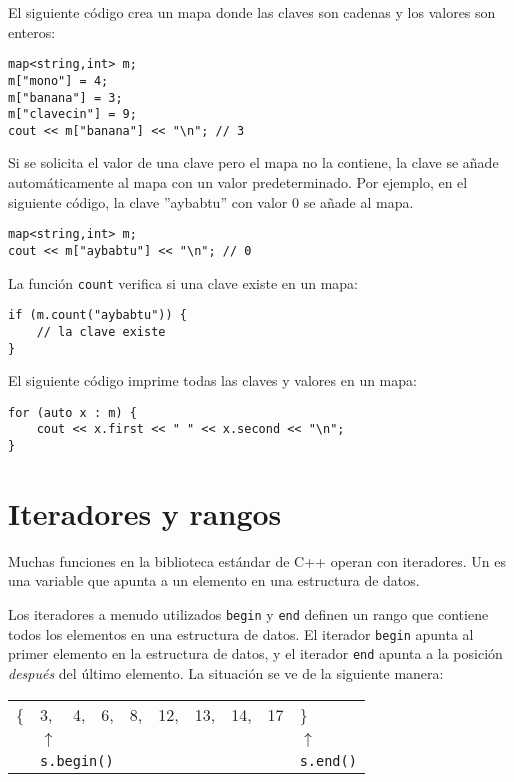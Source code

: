 El siguiente código crea un mapa
donde las claves son cadenas y los valores son enteros:

\begin{lstlisting}
map<string,int> m;
m["mono"] = 4;
m["banana"] = 3;
m["clavecin"] = 9;
cout << m["banana"] << "\n"; // 3
\end{lstlisting}

Si se solicita el valor de una clave
pero el mapa no la contiene,
la clave se añade automáticamente al mapa con
un valor predeterminado.
Por ejemplo, en el siguiente código,
la clave ''aybabtu'' con valor 0
se añade al mapa.

\begin{lstlisting}
map<string,int> m;
cout << m["aybabtu"] << "\n"; // 0
\end{lstlisting}
La función \texttt{count} verifica
si una clave existe en un mapa:
\begin{lstlisting}
if (m.count("aybabtu")) {
    // la clave existe
}
\end{lstlisting}
El siguiente código imprime todas las claves y valores
en un mapa:
\begin{lstlisting}
for (auto x : m) {
    cout << x.first << " " << x.second << "\n";
}
\end{lstlisting}

\section{Iteradores y rangos}


Muchas funciones en la biblioteca estándar de C++
operan con iteradores.
Un  es una variable que apunta
a un elemento en una estructura de datos.

Los iteradores a menudo utilizados \texttt{begin}
y \texttt{end} definen un rango que contiene
todos los elementos en una estructura de datos.
El iterador \texttt{begin} apunta al
primer elemento en la estructura de datos,
y el iterador \texttt{end} apunta a
la posición \emph{después} del último elemento.
La situación se ve de la siguiente manera:

\begin{center}
\begin{tabular}{llllllllll}
\{ & 3, & 4, & 6, & 8, & 12, & 13, & 14, & 17 & \} \\
& $\uparrow$ & & & & & & & & $\uparrow$ \\
& \multicolumn{3}{l}{\texttt{s.begin()}} & & & & & & \texttt{s.end()} \\
\end{tabular}
\end{center}

